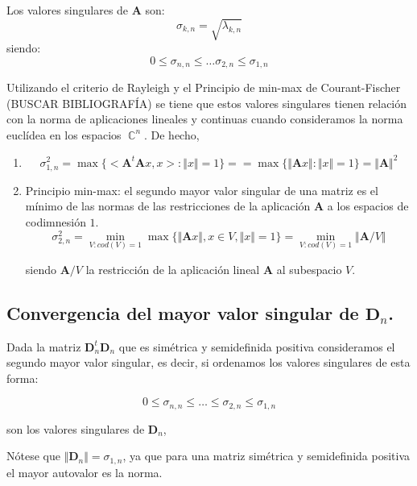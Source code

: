 \documentclass[11pt]{article}
\DeclareMathOperator{\CC}{\mathbb C}%
\begin{document}
\noindent Los valores singulares de $\mathbf{A}$ son:
$$
  \sigma_{k,n}= \sqrt{\lambda_{k,n}}
$$
\noindent siendo:
$$
  0 \leq \sigma_{n,n} \leq \dots \sigma_{2,n} \leq \sigma_{1,n}
$$

\noindent Utilizando el criterio de Rayleigh y el Principio de min-max de  Courant-Fischer  (BUSCAR BIBLIOGRAFÍA) se tiene que estos valores singulares tienen relación con la norma de aplicaciones lineales y continuas cuando consideramos la norma euclídea en los espacios $\CC^{n}$. De hecho,
\begin{enumerate}
  \item
        $$
          \sigma_{1,n}^2 =
          \max \{ <\mathbf{A}^{t}\mathbf{A}x,x>: \Vert x \Vert =1 \}
          =
          = \max \{\Vert \mathbf{A} x \Vert : \Vert x \Vert =1\}=
          \Vert \mathbf{A} \Vert^2
        $$
  \item Principio min-max: el segundo mayor valor singular de una matriz es el mínimo de las normas de las restricciones de la aplicación $\mathbf{A}$ a los espacios de codimnesión $1$.
        $$
          \sigma_{2,n}^2 = \min_{V: cod(V)=1} \max \{\Vert \mathbf{A}x \Vert , x\in V, \Vert x \Vert =1\}= \min_{V: cod(V)=1} \Vert \mathbf{A}/V \Vert
        $$

        \noindent siendo $\mathbf{A}/V$ la restricción de la aplicación lineal $\mathbf{A}$ al subespacio $V$.

\end{enumerate}







\subsection{Convergencia del mayor valor singular de $\mathbf{D}_n$.}





\noindent Dada la matriz $\mathbf{D}_n^{t}\mathbf{D}_n$ que es simétrica y semidefinida positiva consideramos el segundo mayor valor singular, es decir, si ordenamos los valores singulares de esta forma:

$$
  0\leq \sigma_{n,n} \leq \dots \leq \sigma_{2,n} \leq \sigma_{1,n}
$$



\noindent son los valores singulares de $\mathbf{D}_n$,

\bigskip

\noindent Nótese que $\Vert \mathbf{D}_n \Vert= \sigma_{1,n}$, ya que para una matriz simétrica y semidefinida positiva el mayor autovalor es la norma.
\end{document}
